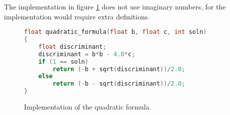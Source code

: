\documentclass{microdoc}
\begin{document}
The implementation in figure \ref{fig:quadC} does not use imaginary
numbers, for the implementation would require extra definitions.
\begin{figure}[h]
\centering
\begin{lstlisting}[language=C,basicstyle=\ttfamily\footnotesize]
float quadratic_formula(float b, float c, int soln)
{
    float discriminant;
    discriminant = b*b - 4.0*c;
    if (1 == soln)
        return (-b + sqrt(discriminant))/2.0;
    else
        return (-b - sqrt(discriminant))/2.0;
}
\end{lstlisting}
\caption{Implementation of the quadratic formula.}
\label{fig:quadC}
\end{figure}
\end{document}
